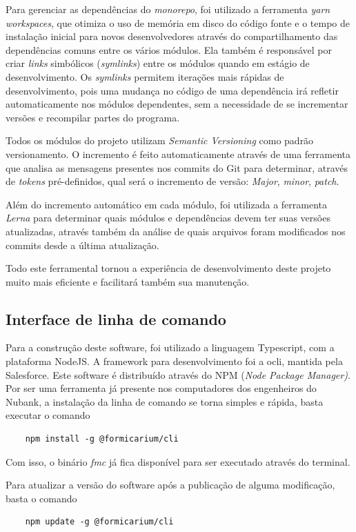 \documentclass[twosideprint]{politex}
\begin{document}
Para gerenciar as dependências do \textit{monorepo}, foi utilizado a ferramenta \textit{yarn workspaces}, que otimiza o uso de memória em disco do código fonte e o tempo de instalação inicial para novos desenvolvedores através do compartilhamento das dependências comuns entre os vários módulos. Ela também é responsável por criar \textit{links} simbólicos (\textit{symlinks}) entre os módulos quando em estágio de desenvolvimento. Os \textit{symlinks} permitem iterações mais rápidas de desenvolvimento, pois uma mudança no código de uma dependência irá refletir automaticamente nos módulos dependentes, sem a necessidade de se incrementar versões e recompilar partes do programa.

Todos os módulos do projeto utilizam \textit{Semantic Versioning} como padrão versionamento. O incremento é feito automaticamente através de uma ferramenta que analisa as mensagens presentes nos commits do Git para determinar, através de \textit{tokens} pré-definidos, qual será o incremento de versão: \textit{Major}, \textit{minor}, \textit{patch}.

Além do incremento automático em cada módulo, foi utilizada a ferramenta \textit{Lerna} para determinar quais módulos e dependências devem ter suas versões atualizadas, através também da análise de quais arquivos foram modificados nos commits desde a última atualização.

Todo este ferramental tornou a experiência de desenvolvimento deste projeto muito mais eficiente e facilitará também sua manutenção.

    \subsection{Interface de linha de comando}
    Para a construção deste software, foi utilizado a linguagem Typescript, com a plataforma NodeJS. A framework para desenvolvimento foi a ocli, mantida pela Salesforce.
    Este software é distribuído através do NPM (\textit{Node Package Manager)}. Por ser uma ferramenta já presente nos computadores dos engenheiros do Nubank, a instalação da linha de comando se torna simples e rápida, basta executar o comando
    \begin{verbatim}
	npm install -g @formicarium/cli
	\end{verbatim}
	
	Com isso, o binário \textit{fmc} já fica disponível para ser executado através do terminal.
	
	Para atualizar a versão do software após a publicação de alguma modificação, basta o comando
	\begin{verbatim}
	npm update -g @formicarium/cli
	\end{verbatim}
	
\end{document}

